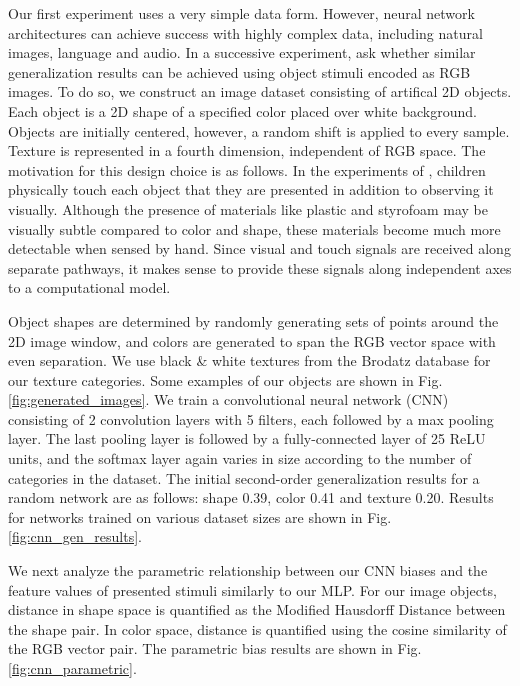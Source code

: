 Our first experiment uses a very simple data form. However, neural network
architectures can achieve success with highly complex data, including natural
images, language and audio. In a successive experiment, ask whether similar
generalization results can be achieved using object stimuli encoded as RGB
images. To do so, we construct an image dataset consisting of artifical 2D
objects. Each object is a 2D shape of a specified color placed over white background.
Objects are initially centered, however, a random shift is applied to every sample.
Texture is represented in a fourth dimension, independent of RGB space. The motivation for this design choice
is as follows. In the experiments of \cite{Smith2002}, children physically touch
each object that they are presented in addition to observing it visually. Although the
presence of materials like plastic and styrofoam may be visually subtle compared
to color and shape, these materials become much more detectable when sensed by hand.
Since visual and touch signals are received along separate pathways, it makes
sense to provide these signals along independent axes to a computational model.

Object shapes are determined by randomly generating sets of points around the 2D
image window, and colors are generated to span the RGB vector space with even
separation. We use black \& white textures from the Brodatz database \citep{Brodatz1966}
for our texture categories. Some examples of our objects are shown in Fig.
\ref{fig:generated_images}. We train a convolutional neural network (CNN)
consisting of 2 convolution layers with 5 filters, each followed by a max pooling
layer. The last pooling layer is followed by a fully-connected layer of 25 ReLU
units, and the softmax layer again varies in size according to the number of
categories in the dataset. The initial second-order generalization results for a
random network are as follows: shape 0.39, color 0.41 and texture 0.20.
Results for networks trained on various dataset sizes are shown in Fig. \ref{fig:cnn_gen_results}.

We next analyze the parametric relationship between our CNN biases and the feature
values of presented stimuli similarly to our MLP. For our image objects,
distance in shape space is quantified as the Modified Hausdorff Distance
\citep{Dubuisson1994} between the shape pair. In color space, distance is
quantified using the cosine similarity of the RGB vector pair. The parametric
bias results are shown in Fig. \ref{fig:cnn_parametric}.


